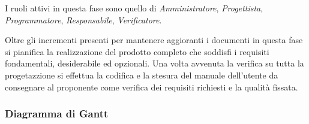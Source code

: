 I ruoli attivi in questa fase sono quello di \textit{Amministratore}, \textit{Progettista}, \textit{Programmatore}, \textit{Responsabile}, \textit{Verificatore}.

Oltre gli incrementi presenti per mantenere aggioranti i documenti in questa fase si pianifica la realizzazione del prodotto completo che soddisfi i requisiti fondamentali, desiderabile ed opzionali. Una volta avvenuta la verifica su tutta la progetazzione si effettua la codifica e la stesura del manuale dell'utente da consegnare al proponente come verifica dei requisiti richiesti e la qualit\`a fissata.

\subsubsection{Diagramma di Gantt}

